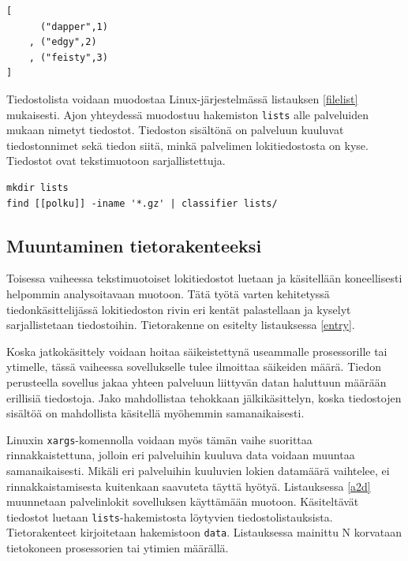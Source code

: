 \begin{lstlisting}[language=MyHaskell,float=h,caption=Tiedoston server.map sisältö.,label=servermap]
[
      ("dapper",1)
    , ("edgy",2)
    , ("feisty",3)
]
\end{lstlisting}

Tiedostolista voidaan muodostaa
Linux-järjestelmässä listauksen \ref{filelist} mukaisesti.
Ajon yhteydessä muodostuu hakemiston \texttt{lists} alle palveluiden
mukaan nimetyt tiedostot. Tiedoston sisältönä on palveluun kuuluvat
tiedostonnimet sekä tiedon siitä, minkä palvelimen lokitiedostosta on kyse. Tiedostot ovat tekstimuotoon 
sarjallistettuja.

\begin{lstlisting}[language=bashshell,label=filelist,aboveskip=1cm,caption=Tiedostolistan
  muodostaminen.]
mkdir lists
find [[polku]] -iname '*.gz' | classifier lists/
\end{lstlisting}

\subsection{Muuntaminen tietorakenteeksi}

Toisessa vaiheessa tekstimuotoiset lokitiedostot luetaan ja
käsitellään koneellisesti helpommin analysoitavaan muotoon. Tätä työtä
varten kehitetyssä tiedonkäsittelijässä lokitiedoston rivin eri kentät
palastellaan ja kyselyt sarjallistetaan tiedostoihin. Tietorakenne on
esitelty listauksessa \ref{entry}.

\lstset{language=MyHaskell}

Koska jatkokäsittely voidaan hoitaa säikeistettynä useammalle
prosessorille tai ytimelle, tässä vaiheessa sovellukselle tulee
ilmoittaa säikeiden määrä. Tiedon perusteella sovellus jakaa yhteen
palveluun liittyvän datan haluttuun määrään erillisiä tiedostoja. Jako
mahdollistaa tehokkaan jälkikäsittelyn, koska tiedostojen sisältöä on
mahdollista käsitellä myöhemmin samanaikaisesti.

Linuxin \texttt{xargs}-komennolla voidaan myös tämän vaihe suorittaa
rinnakkaistettuna, jolloin eri palveluihin kuuluva data voidaan
muuntaa samanaikaisesti. Mikäli eri palveluihin kuuluvien lokien
datamäärä vaihtelee, ei rinnakkaistamisesta kuitenkaan saavuteta
täyttä hyötyä.  Listauksessa \ref{a2d} muunnetaan palvelinlokit
sovelluksen käyttämään muotoon. Käsiteltävät tiedostot luetaan
\texttt{lists}-hakemistosta löytyvien
tiedostolistauksista. Tietorakenteet kirjoitetaan hakemistoon
\texttt{data}. Listauksessa mainittu N korvataan tietokoneen
prosessorien tai ytimien määrällä.

